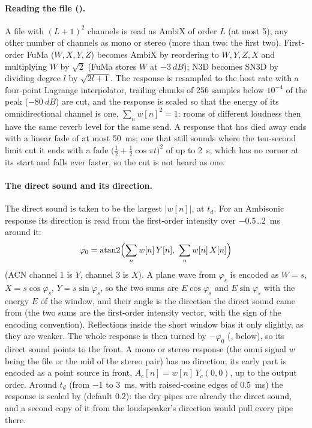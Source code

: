\paragraph{Reading the file ().} A file with $(L+1)^2$ channels is read as AmbiX of order $L$
(at most 5); any other number of channels as mono or stereo (more than two: the first two). First-order FuMa
($W,X,Y,Z$) becomes AmbiX by reordering to $W,Y,Z,X$ and multiplying $W$ by $\sqrt2$ (FuMa stores $W$ at
$-\SI{3}{dB}$); N3D becomes SN3D by dividing degree $l$ by $\sqrt{2l+1}$. The response is resampled to the host rate
with a four-point Lagrange interpolator, trailing chunks of 256 samples below $10^{-4}$ of the peak
($\SI{-80}{dB}$) are cut, and the response is scaled so that the energy of its omnidirectional channel is one,
$\sum_n w[n]^2 = 1$: rooms of different loudness then have the same reverb level for the same send. A response that
has died away ends with a linear fade of at most \SI{50}{ms}; one that still sounds where the ten-second limit cut it
ends with a fade $\bigl(\tfrac12+\tfrac12\cos\pi t\bigr)^2$ of up to \SI{2}{s}, which has no corner at its start and
falls ever faster, so the cut is not heard as one.

\paragraph{The direct sound and its direction.} The direct sound is taken to be the largest $|w[n]|$, at $t_d$. For
an Ambisonic response its direction is read from the first-order intensity over \SI{-0.5}{}\dots\SI{+2}{ms} around it:
\begin{equation}
  \varphi_0 = \operatorname{atan2}\Bigl(\sum_n w[n]\,Y[n],\ \sum_n w[n]\,X[n]\Bigr)
\end{equation}
(ACN channel 1 is $Y$, channel 3 is $X$). A plane wave from $\varphi_s$ is encoded as $W = s$, $X = s\cos\varphi_s$,
$Y = s\sin\varphi_s$, so the two sums are $E\cos\varphi_s$ and $E\sin\varphi_s$ with the energy $E$ of the window, and
their angle is the direction the direct sound came from (the two sums are the first-order intensity vector, with the
sign of the encoding convention). Reflections inside the short window bias it only slightly, as they are weaker. The whole response is then turned by
$-\varphi_0$ (, below), so its direct sound points to the front. A mono or stereo response (the omni
signal $w$ being the file or the mid of the stereo pair) has no direction; its early part is encoded as a point source
in front, $A_c[n] = w[n]\,Y_c(0,0)$, up to the output order. Around $t_d$ (from \SI{-1}{} to \SI{+3}{ms}, with
raised-cosine edges of \SI{0.5}{ms}) the response is scaled by  (default $0.2$): the dry pipes
are already the direct sound, and a second copy of it from the loudspeaker's direction would pull every pipe there.

